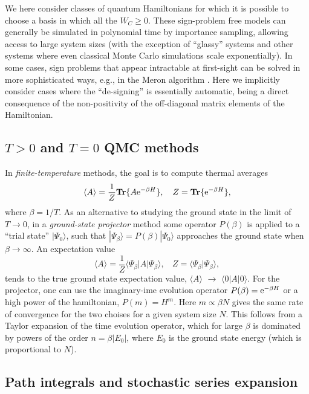 \documentclass[range]{ar2e}
\begin{document}
We here consider classes of quantum Hamiltonians for which it is possible to choose a basis in which all the $W_C\geq 0$. 
These sign-problem free models can generally be simulated in polynomial time by 
importance sampling, allowing access to large system sizes (with the exception of ``glassy'' systems and
other systems where even classical Monte Carlo simulations scale exponentially). In some cases, sign problems that
appear intractable at first-sight can be solved in more sophisticated ways, e.g., in the Meron algorithm \cite{Chandrasekharan99}. 
Here we implicitly consider cases where the ``de-signing'' is essentially automatic, being a direct consequence of the non-positivity of the  
off-diagonal matrix elements of the Hamiltonian.
 
\subsection{$T>0$ and $T=0$ QMC methods}
\label{ss:method}

In {\it finite-temperature} methods, the goal is to compute thermal averages
\begin{equation}
\langle A\rangle = \frac{1}{Z}{\bf Tr}\{ A{\rm e}^{-\beta H}\},~~~
Z = {\bf Tr}\{ {\rm e}^{-\beta H}\},
\label{za1}
\end{equation}
where $\beta=1/T$. As an alternative to studying the ground state in the limit of  $T\to 0$, in a {\it ground-state projector} method some 
operator $P(\beta)$  is applied to a ``trial state'' $|\Psi_0\rangle$, such that $|\Psi_\beta \rangle = P(\beta)|\Psi_0\rangle$ approaches the 
ground state when $\beta \to \infty$. An expectation value
\begin{equation}
\langle A\rangle = \frac{1}{Z}\langle \Psi_\beta|A|\Psi_\beta\rangle,~~~~ Z = \langle \Psi_\beta|\Psi_\beta\rangle,
\label{za2}
\end{equation}
tends to the true ground state expectation value, $\langle A\rangle$ $\to$ $\langle 0| A|0\rangle$. For the projector, one can use the imaginary-ime
evolution operator $P(\beta)={\rm e}^{-\beta H}$ or a high power of the hamiltonian, $P(m)=H^m$. Here $m \propto \beta N$ gives the same rate of 
convergence for the two choises for a given system size $N$. This follows from a Taylor expansion of the time evolution operator, which for large 
$\beta$ is dominated by powers of the order $n=\beta |E_0|$, where $E_0$ is the ground state energy (which is proportional to $N$).

\subsection{Path integrals and stochastic series expansion}
\end{document}
